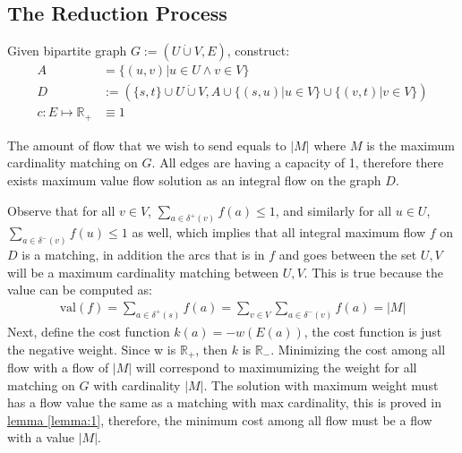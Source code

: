 \documentclass[]{article}
\theoremstyle{definition}
\begin{document}
    \subsection{The Reduction Process}
        Given bipartite graph $G:= (U\dot\cup V, E)$, construct: 
        \begin{align}
            A &= \{(u, v)| u\in U\wedge v \in V\}
            \\
            D &:= (\{s, t\}\cup U\dot\cup V, A \cup \{(s, u)| u \in V\}\cup \{(v, t)| v \in V\})   
            \\
            c: E\mapsto \mathbb R_+ &\equiv 1
        \end{align}
        \par
        The amount of flow that we wish to send equals to $|M|$ where $M$ is the maximum cardinality matching on $G$. All edges are having a capacity of 1, therefore there exists maximum value flow solution as an integral flow on the graph $D$.
        \par
        Observe that for all $v \in V$, $\sum_{a \in \delta^+(v)}^{}f(a) \le 1$, and similarly for all $u \in U$, $\sum_{a \in \delta^-(v)}^{}f(u) \le 1$ as well, which implies that all integral maximum flow $f$ on $D$ is a matching, in addition the arcs that is in $f$ and goes between the set $U, V$ will be a maximum cardinality matching between $U, V$. This is true because the value can be computed as: 
        \begin{align}
            \text{val}(f) = \sum_{a\in \delta^+(s)}f(a) = 
            \sum_{v\in V}^{}\sum_{a \in \delta^-{(v)}}f(a) = |M|
        \end{align}
        Next, define the cost function $k(a) = -w(E(a))$, the cost function is just the negative weight. Since w is $\mathbb R_+$, then $k$ is $\mathbb R_-$. Minimizing the cost among all flow with a flow of $|M|$ will correspond to maximumizing the weight for all matching on $G$ with cardinality $|M|$. The solution with maximum weight must has a flow value the same as a matching with max cardinality, this is proved in \hyperref[lemma:1]{lemma \ref*{lemma:1}}, therefore, the minimum cost among all flow must be a flow with a value $|M|$. 
\end{document}
